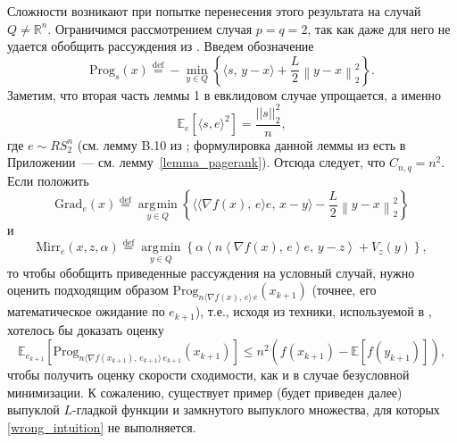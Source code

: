 \documentclass[11pt]{article}
\def\Prog{\text{Prog}}
\newcommand{\E}{\mathbb{E}}
\newcommand{\RR}{\mathbb{R}}
\newcommand{\argmin}{\mathop{\arg\!\min}}
\begin{document}
	Сложности возникают при попытке перенесения этого результата на случай $Q\ne \RR^n$. Ограничимся рассмотрением случая $p=q=2$, так как даже для него не удается обобщить рассуждения из \cite{Allen-Zhu-Orecchia-linear-coupling}. Введем обозначение
	\begin{equation*}
		\Prog_{s}(x) \overset{\text{def}}{=} -\underset{y\in Q}{\min}\left\{ \langle s, \, y-x \rangle + \frac{L}{2} \left \| y-x \right \|_2^2 \right\}.
	\end{equation*}
	Заметим, что вторая часть леммы 1 в евклидовом случае упрощается, а именно
	$$
	\E_e[\langle s,e\rangle^2] = \frac{||s||_2^2}{n},
	$$
	где $e\sim RS_2^n$ (см. лемму B.10 из \cite{pagerank}; формулировка данной леммы из \cite{pagerank} есть в Приложении~--- см. лемму~\ref{lemma_pagerank}). Отсюда следует, что $C_{n,q} = n^2$. Если положить
	$$
	\mbox{Grad}_e \left( x \right) \overset{\text{def}}{=} \underset{y\in Q}{\argmin}\left\{ \langle \langle\nabla f(x), \, e\rangle e, \, x-y \rangle - \frac{L}{2} \left \| y-x \right\|_2^2 \right\}
	$$
	и
	$$
	\mbox{Mirr}_e \left( {x,z,\alpha } \right)\overset{\text{def}}{=} \underset{y\in Q}{{\argmin}} \left\{ {\alpha \left\langle {n\left\langle {\nabla f\left( x \right), \, e} \right\rangle e, \, y-z} \right\rangle +V_z \left( y \right)} \right\},
	$$
	то чтобы обобщить приведенные рассуждения на условный случай, нужно оценить подходящим образом $\Prog_{n\langle\nabla f(x), \, e\rangle \, e}(x_{k+1})$ (точнее, его математическое ожидание по $e_{k+1}$), т.е., исходя из техники, используемой в \cite{Allen-Zhu-Orecchia-linear-coupling}, хотелось бы доказать оценку
	\begin{equation}\label{wrong_intuition}
		\E_{e_{k+1}}\left[\Prog_{n\langle\nabla f(x_{k+1}), \, e_{k+1}\rangle \, e_{k+1}}(x_{k+1})\right] \leqslant n^2 \left(f(x_{k+1})-\E \left [f \left (y_{k+1} \right ) \right ] \right ),
	\end{equation}
	чтобы получить оценку скорости сходимости, как и в случае безусловной минимизации.
	К сожалению, существует пример (будет приведен далее) выпуклой $L$-гладкой функции и замкнутого выпуклого множества, для которых \eqref{wrong_intuition} не выполняется.
	
\end{document}
